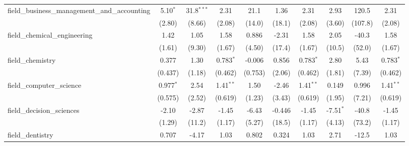 \begin{tabular}{lccccccccc}
   field\_business\_management\_and\_accounting                & 5.10$^{*}$     & 31.8$^{***}$   & 2.31           & 21.1           & 1.36           & 2.31           & 2.93           & 120.5          & 2.31\\   
                                                               & (2.80)         & (8.66)         & (2.08)         & (14.0)         & (18.1)         & (2.08)         & (3.60)         & (107.8)        & (2.08)\\   
   field\_chemical\_engineering                                & 1.42           & 1.05           & 1.58           & 0.886          & -2.31          & 1.58           & 2.05           & -40.3          & 1.58\\   
                                                               & (1.61)         & (9.30)         & (1.67)         & (4.50)         & (17.4)         & (1.67)         & (10.5)         & (52.0)         & (1.67)\\   
   field\_chemistry                                            & 0.377          & 1.30           & 0.783$^{*}$    & -0.006         & 0.856          & 0.783$^{*}$    & 2.80           & 5.43           & 0.783$^{*}$\\   
                                                               & (0.437)        & (1.18)         & (0.462)        & (0.753)        & (2.06)         & (0.462)        & (1.81)         & (7.39)         & (0.462)\\   
   field\_computer\_science                                    & 0.977$^{*}$    & 2.54           & 1.41$^{**}$    & 1.50           & -2.46          & 1.41$^{**}$    & 0.149          & 0.996          & 1.41$^{**}$\\   
                                                               & (0.575)        & (2.52)         & (0.619)        & (1.23)         & (3.43)         & (0.619)        & (1.95)         & (7.21)         & (0.619)\\   
   field\_decision\_sciences                                   & -2.10          & -2.87          & -1.45          & -6.43          & -0.446         & -1.45          & -7.51$^{*}$    & -40.8          & -1.45\\   
                                                               & (1.29)         & (11.2)         & (1.17)         & (5.27)         & (18.5)         & (1.17)         & (4.13)         & (73.2)         & (1.17)\\   
   field\_dentistry                                            & 0.707          & -4.17          & 1.03           & 0.802          & 0.324          & 1.03           & 2.71           & -12.5          & 1.03\\   

\end{tabular}
